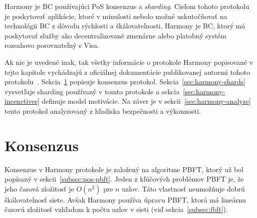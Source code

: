 Harmony je BC používajúci PoS konsenzus a \textit{sharding}. Cieľom tohoto protokolu je poskytovať aplikácie, ktoré v minulosti nebolo možné uskutočňovať na technológii BC z dôvodu rýchlosti a škálovateľnosti. Harmony je BC, ktorý má poskytovať služby ako decentralizované zmenárne alebo platobný systém rozsahovo porovnateľný s Visa.

Ak nie je uvedené inak, tak všetky informácie o protokole Harmony popisované v tejto kapitole vychádzajú z oficiálnej dokumentácie publikovanej autormi tohoto protokolu~\cite{harmonyWp, harmonyDoc}. Sekcia~\ref{sec:harmony-cons} popisuje konsenzus protokol. Sekcia~\ref{sec:harmony-shards} vysvetľuje sharding používaný v tomto protokole a sekcia~\ref{sec:harmony-incenctives} definuje model motivácie. Na záver je v sekcii~\ref{sec:harmony-analyze} tento protokol analyzovaný z hľadiska bezpečnosti a výkonnosti.

\section{Konsenzus}\label{sec:harmony-cons}

Konsenzus v Harmony protokole je založený na algoritme PBFT, ktorý už bol popísaný v sekcii~\ref{subsec:pos-pbft}. Jeden z kľúčových problémov PBFT je, že jeho časová zložitosť je $O(n^2)$ pre $n$ uzlov. Táto vlastnosť neumožňuje dobrú škálovatelnosť siete. Avšak Harmony používa úpravu PBFT, ktorá má lineárnu časovú zložitosť vzhľadom k počtu uzlov v sieti (viď sekcia~\ref{subsec:fbft}).

